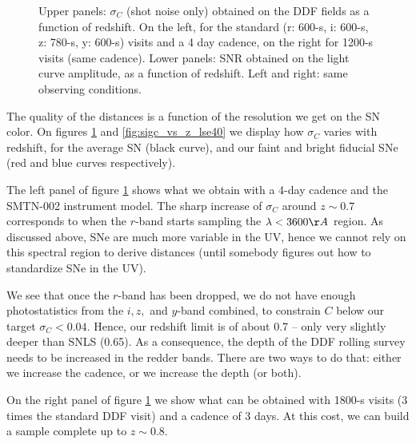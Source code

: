\documentclass[\docopts]{\docclass}
\begin{document}
\begin{figure}
\begin{center}
\end{center}
\caption{Upper panels: $\sigma_C$ (shot noise only) obtained on the
  DDF fields as a function of redshift.  On the left, for the standard
  (r: 600-s, i: 600-s, z: 780-s, y: 600-s) visits and a 4 day cadence,
  on the right for 1200-s visits (same cadence). Lower panels: SNR
  obtained on the light curve amplitude, as a function of
  redshift. Left and right: same observing conditions.}
\label{fig:sigc_vs_z_smtn002}
\end{figure}

The quality of the distances is a function of the resolution we get on
the SN color.  On figures \ref{fig:sigc_vs_z_smtn002} and
\ref{fig:sigc_vs_z_lse40} we display how $\sigma_C$ varies with
redshift, for the average SN (black curve), and our faint and bright
fiducial SNe (red and blue curves respectively).  


The left panel of figure \ref{fig:sigc_vs_z_smtn002} shows what we
obtain with a 4-day cadence and the SMTN-002 instrument model.  The
sharp increase of $\sigma_C$ around $z \sim 0.7$ corresponds to when
the $r$-band starts sampling the $\lambda < 3600\AA$ region. As
discussed above, SNe are much more variable in the UV, hence we cannot
rely on this spectral region to derive distances (until somebody
figures out how to standardize SNe in the UV).

We see that once the $r$-band has been dropped, we do not have enough
photostatistics from the $i,z,$ and $y$-band combined, to constrain
$C$ below our target $\sigma_C < 0.04$.  Hence, our redshift limit is
of about 0.7 -- only very slightly deeper than SNLS (0.65). As a
consequence, the depth of the DDF rolling survey needs to be increased
in the redder bands. There are two ways to do that: either we increase
the cadence, or we increase the depth (or both).

On the right panel of figure \ref{fig:sigc_vs_z_smtn002} we show what
can be obtained with 1800-s visits (3 times the standard DDF visit)
and a cadence of 3 days. At this cost, we can build a sample complete
up to $z \sim 0.8$. 
\end{document}
